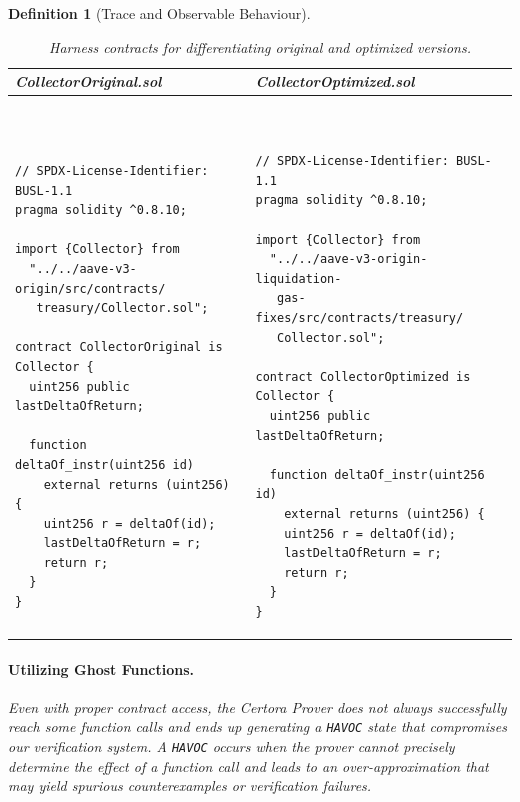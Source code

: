 \documentclass[manuscript,screen,review]{acmart}
\newtheorem{definition}{Definition}
\begin{document}
\begin{definition}[Trace and Observable Behaviour]
\begin{table}[htb]
\caption{Harness contracts for differentiating original and optimized versions.}
\label{lst:harness_example}
\centering
\begin{footnotesize}
\begin{tabular}{|p{}|p{}|}
\hline
\rowcolor[HTML]{EFEFEF}
\textbf{CollectorOriginal.sol} & \textbf{CollectorOptimized.sol} \\
\hline
\vspace*{-0.4cm}
\begin{verbatim}


// SPDX-License-Identifier: BUSL-1.1
pragma solidity ^0.8.10;

import {Collector} from 
  "../../aave-v3-origin/src/contracts/
   treasury/Collector.sol";

contract CollectorOriginal is Collector {
  uint256 public lastDeltaOfReturn;

  function deltaOf_instr(uint256 id)
    external returns (uint256) {
    uint256 r = deltaOf(id);
    lastDeltaOfReturn = r;
    return r;
  }
}
\end{verbatim}
&
\vspace*{-0.4cm}
\begin{verbatim}


// SPDX-License-Identifier: BUSL-1.1
pragma solidity ^0.8.10;

import {Collector} from 
  "../../aave-v3-origin-liquidation-
   gas-fixes/src/contracts/treasury/
   Collector.sol";

contract CollectorOptimized is Collector {
  uint256 public lastDeltaOfReturn;

  function deltaOf_instr(uint256 id)
    external returns (uint256) {
    uint256 r = deltaOf(id);
    lastDeltaOfReturn = r;
    return r;
  }
}
\end{verbatim}
\\ \hline
\end{tabular}
\end{footnotesize}
\end{table}

\paragraph{Utilizing Ghost Functions.}
Even with proper contract access, the Certora Prover does not always successfully reach some function calls and ends up generating a \texttt{HAVOC} state that compromises our verification system. A \texttt{HAVOC} occurs when the prover cannot precisely determine the effect of a function call and leads to an over-approximation that may yield spurious counterexamples or verification failures.


\end{definition}
\end{document}
